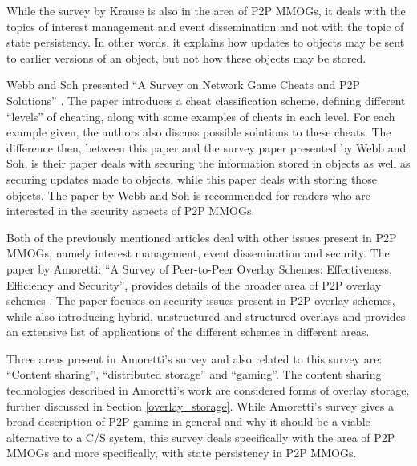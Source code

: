 \documentclass[10pt,a4paper,journal,cspaper,compsoc]{IEEEtran}
\begin{document}
While the survey by Krause is also in the area of P2P MMOGs, it deals with the topics of interest management and event dissemination and not with the
topic of state persistency. In other words, it explains how updates to objects may be sent to earlier versions of an object, but not how these
objects may be stored.

Webb and Soh presented ``A Survey on Network Game Cheats and P2P Solutions'' \cite{survey_p2p_game_cheats}. The paper introduces a cheat
classification scheme, defining different ``levels'' of cheating, along with some examples of cheats in each level. For each example given, the
authors also discuss possible solutions to these cheats. The difference then, between this paper and the survey paper presented by Webb and Soh, is
their paper deals with securing the information stored in objects as well as securing updates made to objects, while this paper deals with storing
those objects. The paper by Webb and Soh is recommended for readers who are interested in the security aspects of P2P MMOGs.

Both of the previously mentioned articles deal with other issues present in P2P MMOGs, namely interest management, event dissemination and security.
The paper by Amoretti: ``A Survey of Peer-to-Peer Overlay Schemes: Effectiveness, Efficiency and Security'', provides details of the broader area of
P2P overlay schemes \cite{amoretti_p2p_overlay_schemes_survey}. The paper focuses on security issues present in P2P overlay schemes, while also
introducing hybrid, unstructured and structured overlays and provides an extensive list of applications of the different schemes in different areas.

Three areas present in Amoretti's survey and also related to this survey are: ``Content sharing'', ``distributed storage'' and ``gaming''. The
content sharing technologies described in Amoretti's work are considered forms of overlay storage, further discussed in Section
\ref{overlay_storage}. While Amoretti's survey gives a broad description of P2P gaming in general and why it should be a viable alternative to a C/S
system, this survey deals specifically with the area of P2P MMOGs and more specifically, with state persistency in P2P MMOGs.
\end{document}
